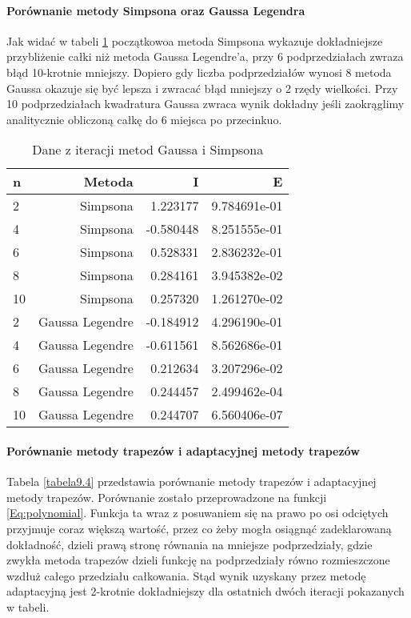 \documentclass[12pt,twoside]{article}
\begin{document}
\paragraph{Porównanie metody Simpsona oraz Gaussa Legendra}\mbox{}

Jak widać w tabeli \ref{tabela9.3} początkowoa metoda Simpsona wykazuje dokładniejsze przybliżenie całki niż metoda Gaussa Legendre'a, przy 6 podprzedziałach zwraza błąd 10-krotnie mniejszy. Dopiero gdy liczba podprzedziałów wynosi 8 metoda Gaussa okazuje się być lepsza i zwracać błąd mniejszy o 2 rzędy wielkości. 
Przy 10 podprzedziałach kwadratura Gaussa zwraca wynik dokładny jeśli zaokrąglimy analitycznie obliczoną całkę do 6 miejsca po przecinkuo.

\begin{table}[h]
\centering 
\caption{Dane z iteracji metod Gaussa i Simpsona }
\label{tabela9.3}
\begin{tabular}{lrrr}
\toprule
{n} & Metoda &  I &  E \\
\midrule
2  &     Simpsona & 1.223177 &   9.784691e-01 \\
4  &     Simpsona & -0.580448  &   8.251555e-01  \\
6  &     Simpsona &  0.528331  &   2.836232e-01  \\
8  &     Simpsona & 0.284161 &   3.945382e-02  \\
10 &     Simpsona & 0.257320 &   1.261270e-02  \\
\midrule
2  &     Gaussa Legendre & -0.184912 &  4.296190e-01   \\
4  &     Gaussa Legendre & -0.611561 &  8.562686e-01   \\
6  &     Gaussa Legendre & 0.212634 &  3.207296e-02   \\
8  &     Gaussa Legendre & 0.244457 &  2.499462e-04  \\
10 &     Gaussa Legendre & 0.244707 &  6.560406e-07  \\

\bottomrule
\end{tabular}
\end{table}


\paragraph{Porównanie metody trapezów i adaptacyjnej metody trapezów}\mbox{}

Tabela \ref{tabela9.4} przedstawia porównanie metody trapezów i adaptacyjnej metody trapezów. Porównanie zostało przeprowadzone na funkcji \eqref{Eq:polynomial}. Funkcja ta wraz z posuwaniem się na prawo po osi odciętych przyjmuje coraz większą wartość, przez co żeby mogła osiągnąć zadeklarowaną dokładność, dzieli prawą stronę równania na mniejsze podprzedziały, gdzie zwykła metoda trapezów dzieli funkcję na podprzedziały równo rozmieszczone wzdłuż całego przedziału całkowania. Stąd wynik uzyskany przez metodę adaptacyjną jest 2-krotnie dokładniejszy dla ostatnich dwóch iteracji pokazanych w tabeli.
\end{document}
